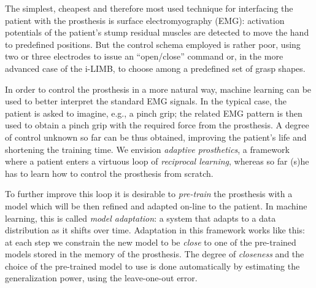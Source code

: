 The simplest, cheapest and therefore most used technique for
interfacing the patient with the prosthesis is surface
electromyography (EMG): activation potentials of the patient's stump
residual muscles are detected to move the hand to predefined
positions. But the control schema employed is rather poor, using two
or three electrodes to issue an ``open/close'' command or, in the more
advanced case of the i-LIMB, to choose among a predefined set of grasp
shapes.


In order to control the prosthesis in a more natural way, machine
learning can be used to better interpret the standard EMG signals. In
the typical case, the patient is asked to imagine, e.g., a pinch grip;
the related EMG pattern is then used to obtain a pinch grip with the
required force from the prosthesis. A degree of control unknown so far
can be thus obtained, improving the patient's life and shortening the
training time. We envision \emph{adaptive prosthetics}, a framework where
 a patient enters a virtuous loop of \emph{reciprocal learning},
whereas so far (s)he has to learn how to control the prosthesis from
scratch.


To further improve this loop it is desirable to \emph{pre-train} the
prosthesis with a model which will be then refined and adapted on-line
to the patient. In machine learning, this is called \emph{model
adaptation}: a system 
that adapts to a 
data distribution as 
it shifts over time. %
Adaptation in this framework
works like this: at each step we constrain the new model to be \emph{close}
to one of the pre-trained models stored in the memory of the prosthesis.
The degree of \emph{closeness} and the choice of the pre-trained model
to use is done automatically by estimating the generalization power, using
the leave-one-out error.

